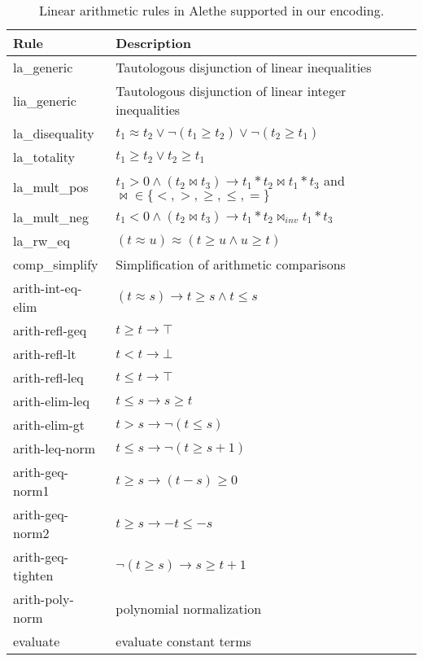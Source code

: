 \begin{table}[tp]
  \centering
  \begin{tabular}{ll}
  Rule & Description \\ \hline
  la\_generic & Tautologous disjunction of linear inequalities \\
  lia\_generic & Tautologous disjunction of linear integer inequalities \\
  la\_disequality & $t_1 \approx t_2 \lor \neg (t_1 \geq t_2) \lor \neg (t_2 \geq t_1)$ \\
  la\_totality & $t_1 \geq t_2 \lor t_2 \geq t_1$ \\
  la\_mult\_pos & $t_1 > 0 \land (t_2 \bowtie t_3) \rightarrow t_1 * t_2 \bowtie t_1 * t_3$ and $\bowtie \in \{<, >, \geq, \leq, =\}$ \\
  la\_mult\_neg & $t_1 < 0 \land (t_2 \bowtie t_3) \rightarrow t_1 * t_2 \bowtie_{inv} t_1 * t_3$ \\
  la\_rw\_eq & $(t \approx u) \approx (t \geq u \land u \geq t)$ \\
  comp\_simplify & Simplification of arithmetic comparisons \\
  arith-int-eq-elim & $(t \approx s) \rightarrow t \geq s \land t \leq s $\\
  arith-refl-geq & $t \geq t \rightarrow \top$ \\
  arith-refl-lt & $t < t \rightarrow \bot$ \\
  arith-refl-leq & $t \leq t \rightarrow \top$ \\
  arith-elim-leq & $t \leq s \rightarrow s \geq t$ \\
  arith-elim-gt & $t > s \rightarrow \neg (t \leq s)$ \\
  arith-leq-norm & $t \leq s \rightarrow \neg (t \geq s + 1)$ \\
  arith-geq-norm1 & $t \geq s \rightarrow (t - s) \geq 0$ \\
  arith-geq-norm2 & $t \geq s \rightarrow - t \leq - s$ \\
  arith-geq-tighten & $\neg (t \geq s) \rightarrow s \geq t + 1$ \\
  arith-poly-norm & polynomial normalization \\
  evaluate & evaluate constant terms
  \end{tabular}

  \caption{Linear arithmetic rules in Alethe supported in our encoding.}
  \label{table:linear-arith-rules}
\end{table}

